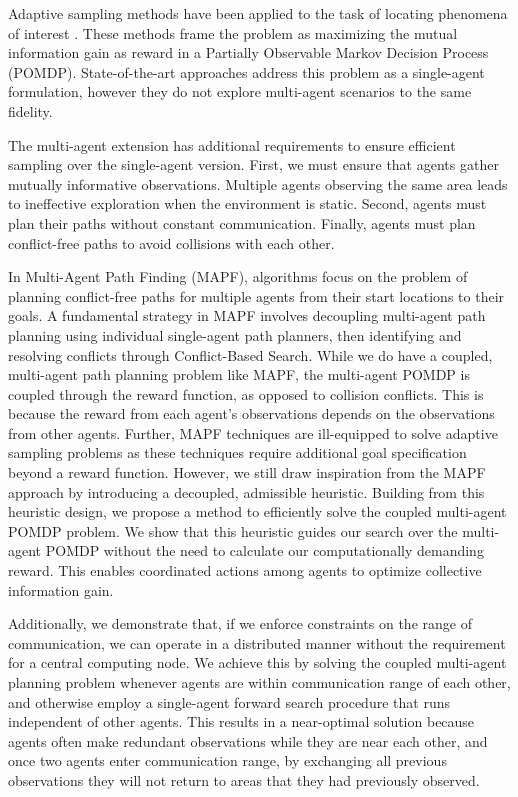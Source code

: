 \documentclass[letterpaper, 10 pt, conference]{IEEEConference}
\begin{document}
Adaptive sampling methods have been applied to the task of locating phenomena of interest \cite{ayton2017}. These methods frame the problem as maximizing the mutual information gain as reward in a Partially Observable Markov Decision Process (POMDP). State-of-the-art approaches address this problem as a single-agent formulation, however they do not explore multi-agent scenarios to the same fidelity. 

The multi-agent extension has additional requirements to ensure efficient sampling over the single-agent version. First, we must ensure that agents gather mutually informative observations. Multiple agents observing the same area leads to ineffective exploration when the environment is static. Second, agents must plan their paths without constant communication. Finally, agents must plan conflict-free paths to avoid collisions with each other.

In Multi-Agent Path Finding (MAPF), algorithms focus on the problem of planning conflict-free paths for multiple agents from their start locations to their goals. A fundamental strategy in MAPF involves decoupling multi-agent path planning using individual single-agent path planners, then identifying and resolving conflicts through Conflict-Based Search. While we do have a coupled, multi-agent path planning problem like MAPF, the multi-agent POMDP is coupled through the reward function, as opposed to collision conflicts. This is because the reward from each agent's observations depends on the observations from other agents. Further, MAPF techniques are ill-equipped to solve adaptive sampling problems as these techniques require additional goal specification beyond a reward function. However, we still draw inspiration from the MAPF approach by introducing a decoupled, admissible heuristic. Building from this heuristic design, we propose a method to efficiently solve the coupled multi-agent POMDP problem. We show that this heuristic guides our search over the multi-agent POMDP without the need to calculate our computationally demanding reward. This enables coordinated actions among agents to optimize collective information gain. 

Additionally, we demonstrate that, if we enforce constraints on the range of communication, we can operate in a distributed manner without the requirement for a central computing node. We achieve this by solving the coupled multi-agent planning problem whenever agents are within communication range of each other, and otherwise employ a single-agent forward search procedure that runs independent of other agents. This results in a near-optimal solution because agents often make redundant observations while they are near each other, and once two agents enter communication range, by exchanging all previous observations they will not return to areas that they had previously observed.
\end{document}
